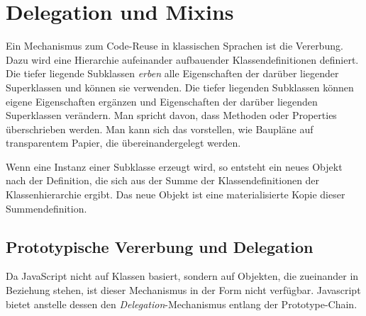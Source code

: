 
\section{Delegation und Mixins}

Ein Mechanismus zum Code-Reuse in klassischen Sprachen ist die Vererbung. Dazu wird eine Hierarchie aufeinander aufbauender Klassendefinitionen definiert. Die tiefer liegende Subklassen \emph{erben} alle Eigenschaften der darüber liegender Superklassen und können sie verwenden. Die tiefer liegenden Subklassen können eigene Eigenschaften ergänzen und Eigenschaften der darüber liegenden Superklassen verändern. Man spricht davon, dass Methoden oder Properties überschrieben werden. Man kann sich das vorstellen, wie Baupläne auf transparentem Papier, die übereinandergelegt werden. 

Wenn eine Instanz einer Subklasse erzeugt wird, so entsteht ein neues Objekt nach der Definition, die sich aus der Summe der Klassendefinitionen der Klassenhierarchie ergibt. Das neue Objekt ist eine materialisierte Kopie dieser Summendefinition.

\subsection{Prototypische Vererbung und Delegation}

Da JavaScript nicht auf Klassen basiert, sondern auf Objekten, die zueinander in Beziehung stehen, ist dieser Mechanismus in der Form nicht verfügbar. Javascript bietet anstelle dessen den \emph{Delegation}-Mechanismus entlang der Prototype-Chain.

